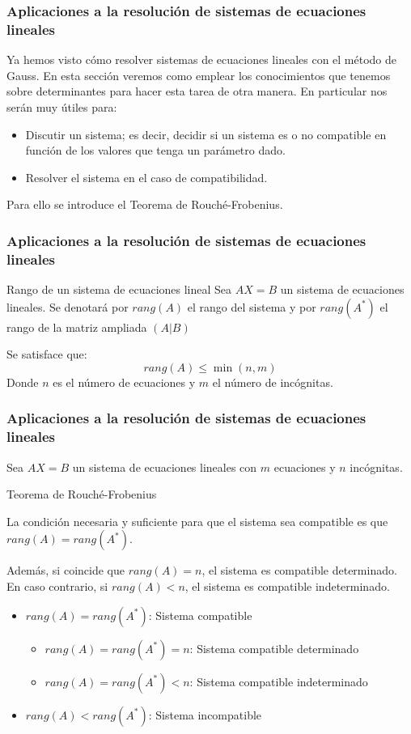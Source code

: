 \documentclass[12pt]{article}
\begin{document}
     \begin{frame}
  \frametitle{Aplicaciones a la resoluci\'on de sistemas de ecuaciones lineales}
Ya hemos visto c\'omo resolver sistemas de ecuaciones lineales con el m\'etodo de Gauss. En esta secci\'on veremos como emplear los conocimientos que tenemos sobre determinantes para hacer esta tarea de otra manera. En particular nos ser\'an muy \'utiles para:
\begin{itemize}
\item Discutir un sistema; es decir, decidir si un sistema es o no compatible en funci\'on de los valores que tenga un par\'ametro dado.
\item Resolver el sistema en el caso de compatibilidad.
\end{itemize}
Para ello se introduce el Teorema de Rouch\'e-Frobenius.
\end{frame} 

     \begin{frame}
  \frametitle{Aplicaciones a la resoluci\'on de sistemas de ecuaciones lineales}
     \begin{block}{Rango de un sistema de ecuaciones lineal}
Sea $AX=B$ un sistema de ecuaciones lineales. Se denotar\'a por $rang(A)$ el rango del sistema y por $rang(A^*)$ el rango de la matriz ampliada $(A|B)$
\end{block}
Se satisface que: 
\[rang(A) \leq \min(n,m)\]
Donde $n$ es el n\'umero de ecuaciones y $m$ el n\'umero de inc\'ognitas.
\end{frame} 


     \begin{frame}
  \frametitle{Aplicaciones a la resoluci\'on de sistemas de ecuaciones lineales}
  Sea $AX=B$ un sistema de ecuaciones lineales con $m$ ecuaciones y $n$ inc\'ognitas. 

     \begin{block}{Teorema de Rouch\'e-Frobenius}

La condici\'on necesaria y suficiente para que el sistema sea compatible es que $rang(A) = rang(A^*)$.

Adem\'as, si coincide que $rang(A) = n$, el sistema es compatible determinado. En caso contrario, si $rang(A)<n$, el sistema es compatible indeterminado.


\end{block}
\begin{itemize}
\item $rang(A) = rang(A^*)$: Sistema compatible
\begin{itemize}
\item $rang(A) = rang(A^*) = n$: Sistema compatible determinado
\item $rang(A) = rang(A^*)<n$: Sistema compatible indeterminado
\end{itemize}
\item $rang(A) < rang(A^*)$: Sistema incompatible
\end{itemize}
\end{frame} 
\end{document}
